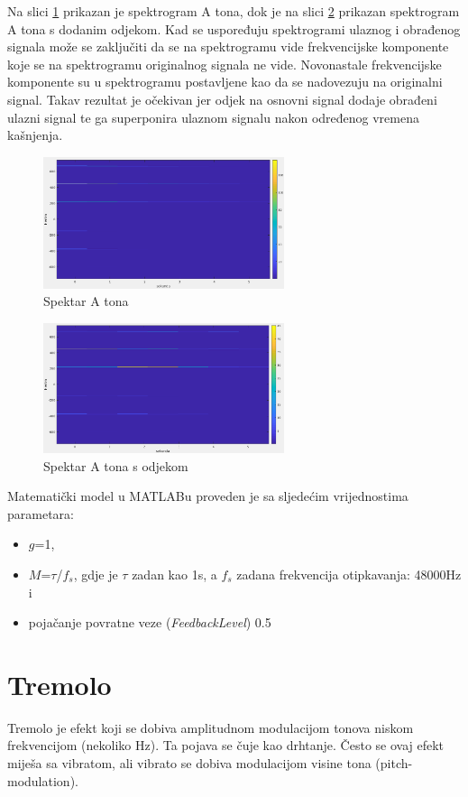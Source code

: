 \documentclass[conference]{IEEEtran}
\begin{document}
Na slici \ref{A_ulaz_spektar} prikazan je spektrogram A tona, dok je na slici \ref{echo} prikazan spektrogram
A tona s dodanim odjekom. Kad se uspoređuju spektrogrami ulaznog i obrađenog signala može se zaključiti da se
na spektrogramu vide frekvencijske komponente koje se na spektrogramu originalnog signala ne vide. Novonastale
frekvencijske komponente su u spektrogramu postavljene kao da se nadovezuju na originalni signal. Takav rezultat je
očekivan jer odjek na osnovni signal dodaje obrađeni ulazni signal te ga superponira ulaznom signalu nakon određenog
vremena kašnjenja.

\begin{figure}[H]
  \centerline{\includegraphics[width=200pt]{slike/A_ton_ulaz.png}}
  \caption{Spektar A tona}
  \label{A_ulaz_spektar}
\end{figure}

\begin{figure}[H]
  \centerline{\includegraphics[width=200pt]{slike/A_ton_echo.png}}
  \caption{Spektar A tona s odjekom}
  \label{echo}
\end{figure}

Matematički model u MATLABu proveden je sa sljedećim vrijednostima parametara:
\begin{itemize}
  \item{$g$=1,}
  \item{$M$=$\tau$/$f_{s}$, gdje je $\tau$ zadan kao 1s, a $f_{s}$ zadana frekvencija otipkavanja: 48000Hz i}
  \item{pojačanje povratne veze (\textit{FeedbackLevel}) 0.5}
\end{itemize}

\section{Tremolo}
Tremolo je efekt koji se dobiva amplitudnom modulacijom tonova niskom frekvencijom (nekoliko Hz). Ta pojava se čuje
kao drhtanje. Često se ovaj efekt miješa sa vibratom, ali vibrato se dobiva modulacijom visine tona (pitch-modulation).
\end{document}

